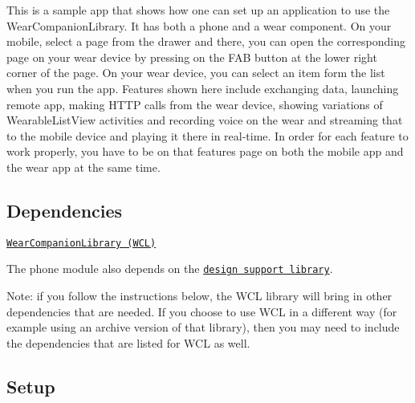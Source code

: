 This is a sample app that shows how one can set up an application to use the Wear\+Companion\+Library. It has both a phone and a wear component. On your mobile, select a page from the drawer and there, you can open the corresponding page on your wear device by pressing on the F\+AB button at the lower right corner of the page. On your wear device, you can select an item form the list when you run the app. Features shown here include exchanging data, launching remote app, making H\+T\+TP calls from the wear device, showing variations of Wearable\+List\+View activities and recording voice on the wear and streaming that to the mobile device and playing it there in real-\/time. In order for each feature to work properly, you have to be on that feature\textquotesingle{}s page on both the mobile app and the wear app at the same time.

\subsection*{Dependencies}


\begin{DoxyItemize}
\item \href{https://github.com/googlesamples/android-WearCompanionLibrary}{\tt Wear\+Companion\+Library (W\+CL)}
\item The phone module also depends on the \href{http://android-developers.blogspot.com/2015/05/android-design-support-library.html}{\tt design support library}.
\item Note\+: if you follow the instructions below, the W\+CL library will bring in other dependencies that are needed. If you choose to use W\+CL in a different way (for example using an archive version of that library), then you may need to include the dependencies that are listed for W\+CL as well.
\end{DoxyItemize}

\subsection*{Setup}


